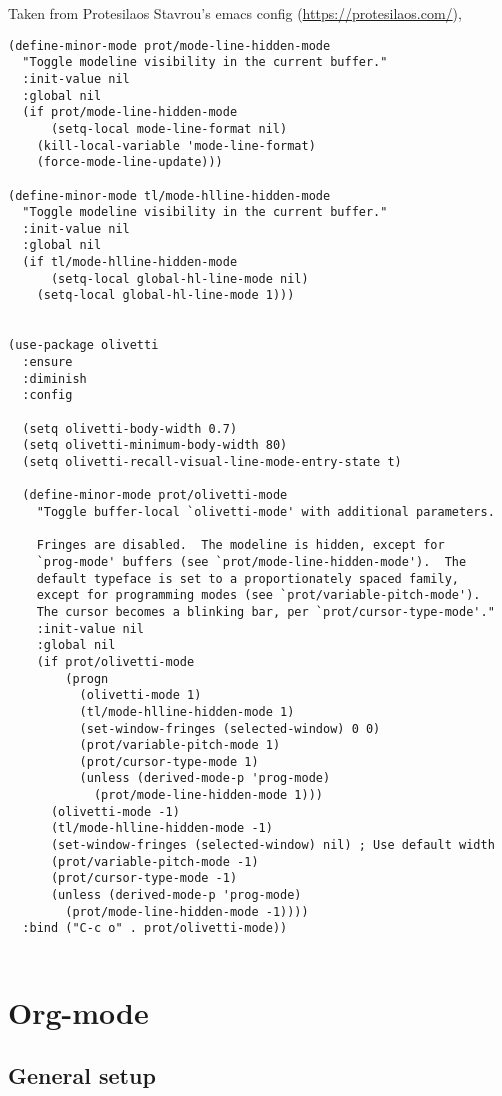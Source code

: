 \documentclass[12pt]{article}
\begin{document}
Taken from Protesilaos Stavrou's emacs config (\url{https://protesilaos.com/}),
\begin{verbatim}
(define-minor-mode prot/mode-line-hidden-mode
  "Toggle modeline visibility in the current buffer."
  :init-value nil
  :global nil
  (if prot/mode-line-hidden-mode
      (setq-local mode-line-format nil)
    (kill-local-variable 'mode-line-format)
    (force-mode-line-update)))

(define-minor-mode tl/mode-hlline-hidden-mode
  "Toggle modeline visibility in the current buffer."
  :init-value nil
  :global nil
  (if tl/mode-hlline-hidden-mode
      (setq-local global-hl-line-mode nil)
    (setq-local global-hl-line-mode 1)))


(use-package olivetti
  :ensure
  :diminish
  :config

  (setq olivetti-body-width 0.7)
  (setq olivetti-minimum-body-width 80)
  (setq olivetti-recall-visual-line-mode-entry-state t)

  (define-minor-mode prot/olivetti-mode
    "Toggle buffer-local `olivetti-mode' with additional parameters.

    Fringes are disabled.  The modeline is hidden, except for
    `prog-mode' buffers (see `prot/mode-line-hidden-mode').  The
    default typeface is set to a proportionately spaced family,
    except for programming modes (see `prot/variable-pitch-mode').
    The cursor becomes a blinking bar, per `prot/cursor-type-mode'."
    :init-value nil
    :global nil
    (if prot/olivetti-mode
        (progn
          (olivetti-mode 1)
          (tl/mode-hlline-hidden-mode 1)
          (set-window-fringes (selected-window) 0 0)
          (prot/variable-pitch-mode 1)
          (prot/cursor-type-mode 1)
          (unless (derived-mode-p 'prog-mode)
            (prot/mode-line-hidden-mode 1)))
      (olivetti-mode -1)
      (tl/mode-hlline-hidden-mode -1)
      (set-window-fringes (selected-window) nil) ; Use default width
      (prot/variable-pitch-mode -1)
      (prot/cursor-type-mode -1)
      (unless (derived-mode-p 'prog-mode)
        (prot/mode-line-hidden-mode -1))))
  :bind ("C-c o" . prot/olivetti-mode))


\end{verbatim}

\section{Org-mode}
\label{sec:org1060563}
\subsection{General setup}
\label{sec:orgb8d64a7}
\end{document}

